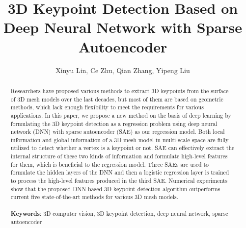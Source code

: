 \documentclass[runningheads]{article}
\begin{document}
	
	\title{3D Keypoint Detection Based on Deep Neural Network with Sparse Autoencoder} %
	
	\author{Xinyu Lin, Ce Zhu, Qian Zhang, Yipeng Liu}
	\date{}
	\renewcommand{\thefootnote}{\fnsymbol{footnote}}
	
	\maketitle

\begin{abstract}
Researchers have proposed various methods to extract 3D keypoints from the surface of 3D mesh models over the last decades, but most of them are based on geometric methods, which lack enough flexibility to meet the requirements for various applications. In this paper, we propose a new method on the basis of deep learning by formulating the 3D keypoint detection as a regression problem using deep neural network (DNN) with sparse autoencoder (SAE) as our regression model. Both local information and global information of a 3D mesh model in multi-scale space are fully utilized to detect whether a vertex is a keypoint or not. SAE can effectively extract the internal structure of these two kinds of information and formulate high-level features for them, which is beneficial to the regression model. Three SAEs are used to formulate the hidden layers of the DNN and then a logistic regression layer is trained to process the high-level features produced in the third SAE. Numerical experiments show that the proposed DNN based 3D keypoint detection algorithm outperforms current five state-of-the-art methods for various 3D mesh models.
\\
\\
\textbf{Keywords}: 3D computer vision, 3D keypoint detection, deep neural network, sparse autoencoder
\end{abstract}
\end{document}

